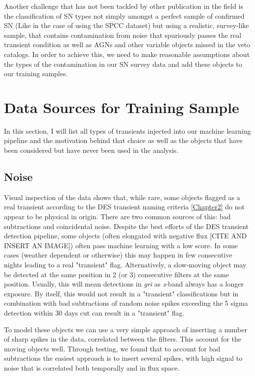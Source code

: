 Another challenge that has not been tackled by other publication in the field is the classification of SN types not simply amongst a perfect sample of confirmed SN (Like in the case of using the SPCC dataset) but using a realistic, survey-like sample, that contains contamination from noise that spuriously passes the real transient condition as well as AGNs and other variable objects missed in the veto catalogs. In order to achieve this, we need to make reasonable assumptions about the types of the contamination in our SN survey data and add these objects to our training samples.

\section{Data Sources for Training Sample}
In this section, I will list all types of transients injected into our machine learning pipeline and the motivation behind that choice as well as the objects that have been considered but have never been used in the analysis.

\subsection{Noise}
Visual inspection of the data shows that, while rare, some objects flagged as a real transient according to the DES transient naming criteria \cref{Chapter2} do not appear to be physical in origin. There are two common sources of this: bad subtractions and coincidental noise. Despite the best efforts of the DES transient detection pipeline, some objects (often elongated with negative flux [CITE AND INSERT AN IMAGE]) often pass machine learning with a low score. In some cases (weather dependent or otherwise) this may happen in few consecutive nights leading to a real "transient" flag. Alternatively, a slow-moving object may be detected at the same position in 2 (or 3) consecutive filters at the same position. Usually, this will mean detections in \textit{gri} as \textit{z}-band always has a longer exposure. By itself, this would not result in a "transient" classifications but in combination with bad subtractions of random noise spikes exceeding the 5 sigma detection within 30 days cut can result in a "transient" flag.

To model these objects we can use a very simple approach of inserting a number of sharp spikes in the data, correlated between the filters. This account for the moving objects well. Through testing, we found that to account for bad subtractions the easiest approach is to insert several spikes, with high signal to noise that is correlated both temporally and in flux space.

